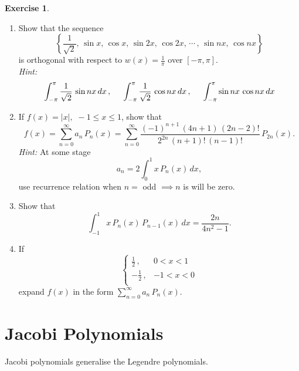 \documentclass[12pt,a4paper]{report}
\theoremstyle{definition}
\newtheorem{exe}[thm]{Exercise}
\theoremstyle{plain}
\begin{document}
\begin{exe}
\vspace{-6pt}
\begin{enumerate}
\item Show that the sequence
$$\left\{\frac{1}{\sqrt{2}}, \, \sin x, \, \cos x, \, \sin 2x, \, \cos 2x, \, \cdots\, , \, \sin nx, \, \cos nx\right\}$$ is orthogonal with respect to $w(x) = \frac{1}{\pi}$ over $[-\pi, \pi]$. \\
\textit{Hint:} $$ \int_{-\pi}^{\pi} \frac{1}{\sqrt{2}}\, \sin nx\, dx\, , \hspace{0.5cm} \int_{-\pi}^{\pi} \frac{1}{\sqrt{2}}\, \cos nx\, dx\, , \hspace{0.5cm} \int_{-\pi}^{\pi} \sin nx\, \cos nx\, dx$$


\item If $f(x) = |x|, \,\, -1 \leq x \leq 1$, show that 
$$f(x) = \sum_{n=0}^{\infty} a_n\, P_n(x) = \sum_{n=0}^{\infty} \frac{(-1)^{n+1}\,(4n+1)\, (2n-2)!}{2^{2n}\, (n+1)!\, (n-1)!}\, P_{2n}(x).$$
\textit{Hint:} At some stage $$a_n = 2\int_0^1 x\, P_n(x)\, dx,$$ use recurrence relation when $n=$ odd $\implies n$ is will be zero.


\item Show that $$\int_{-1}^1x\, P_n(x)\, P_{n-1}(x)\, dx = \frac{2n}{4n^2 - 1}.$$

\item If $$\begin{cases}
            \frac{1}{2}\, , & 0 < x < 1\\
            -\frac{1}{2}\, , & -1 < x < 0\\
           \end{cases}$$ expand $f(x)$ in the form $\sum_{n=0}^{\infty}a_n\, P_n(x)$.
\end{enumerate}
\end{exe}
\vspace{5mm}


















\section{Jacobi Polynomials}
\vspace*{-5mm}
Jacobi polynomials generalise the Legendre polynomials.
\end{document}
